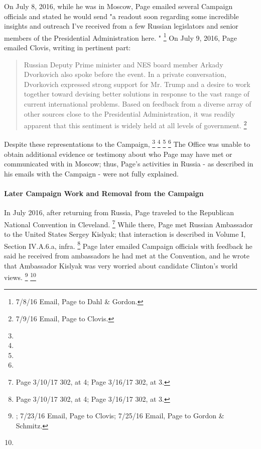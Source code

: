 On July 8, 2016, while he was in Moscow, Page emailed several Campaign officials and stated he would send "a readout soon regarding some incredible insights and outreach I've received from a few Russian legislators and senior members of the Presidential Administration here. "%
\footnote{ 7/8/16 Email, Page to Dahl \& Gordon.}
On July 9, 2016, Page emailed Clovis, writing in pertinent part:

\begin{quote}
Russian Deputy Prime minister and NES board member Arkady Dvorkovich also spoke before the event.
In a private conversation, Dvorkovich expressed strong support for Mr. Trump and a desire to work together toward devising better solutions in response to the vast range of current international problems.
Based on feedback from a diverse array of other sources close to the Presidential Administration, it was readily apparent that this sentiment is widely held at all levels of government.%
\footnote{ 7/9/16 Email, Page to Clovis.}
\end{quote}

Despite these representations to the Campaign,
\footnote{}
\footnote{}
\footnote{}
\footnote{}
The Office was unable to obtain additional evidence or testimony about who Page may have met or communicated with in Moscow; thus, Page's activities in Russia - as described in his emails with the Campaign - were not fully explained.

\paragraph{Later Campaign Work and Removal from the Campaign}

In July 2016, after returning from Russia, Page traveled to the Republican National Convention in Cleveland.%
\footnote{Page 3/10/17 302, at 4; 
Page 3/16/17 302, at 3.}
While there, Page met Russian Ambassador to the United States Sergey Kislyak; that interaction is described in Volume I, Section IV.A.6.a, infra.%
\footnote{Page 3/10/17 302, at 4; 
Page 3/16/17 302, at 3.}
Page later emailed Campaign officials with feedback he said he received from ambassadors he had met at the Convention, and he wrote that Ambassador Kislyak was very worried about candidate Clinton's world views.%
\footnote{; 7/23/16 Email, Page to Clovis; 
7/25/16 Email, Page to Gordon \& Schmitz.}
\footnote{}

